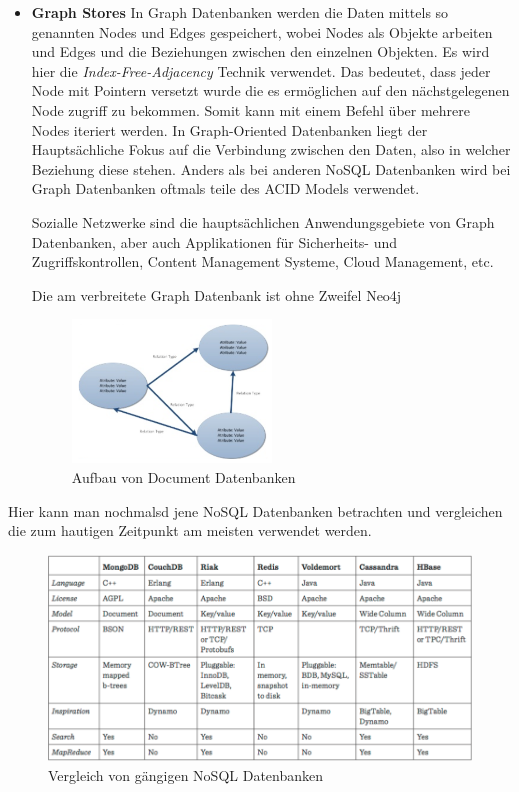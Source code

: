 \begin{itemize}
	\clearpage

	\item \textbf{Graph Stores\newline}
	In Graph Datenbanken werden die Daten mittels so genannten Nodes und Edges gespeichert, wobei Nodes als Objekte arbeiten und Edges und die Beziehungen zwischen den einzelnen Objekten. Es wird hier die \textit{Index-Free-Adjacency} Technik verwendet. Das bedeutet, dass jeder Node mit Pointern versetzt wurde die es ermöglichen auf den nächstgelegenen Node zugriff zu bekommen. Somit kann mit einem Befehl über mehrere Nodes iteriert werden. In Graph-Oriented Datenbanken liegt der Hauptsächliche Fokus auf die Verbindung zwischen den Daten, also in welcher Beziehung diese stehen. Anders als bei anderen NoSQL Datenbanken wird bei Graph Datenbanken oftmals teile des ACID Models verwendet.

	Sozialle Netzwerke sind die hauptsächlichen Anwendungsgebiete von Graph Datenbanken, aber auch Applikationen für Sicherheits- und Zugriffskontrollen, Content Management Systeme, Cloud Management, etc. 

	Die am verbreitete Graph Datenbank ist ohne Zweifel Neo4j

	\begin{figure}[!htb]\centering
		\includegraphics[width=0.5\textwidth]{images/graphStore}
		\caption{Aufbau von Document Datenbanken}
	\end{figure}
\end{itemize}
\clearpage

Hier kann man nochmalsd jene NoSQL Datenbanken betrachten und vergleichen die zum hautigen Zeitpunkt am meisten verwendet werden.

\begin{figure}[!htb]\centering
	\includegraphics[width=1\textwidth]{images/noSQLComp}
	\caption{Vergleich von gängigen NoSQL Datenbanken\cite{MELD.CH2-dbms.compNoSQL}}
\end{figure}


\clearpage %